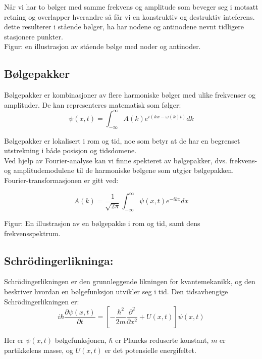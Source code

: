 Når vi har to bølger med samme frekvens og amplitude som beveger seg i motsatt retning og overlapper hverandre så får vi en konstruktiv og destruktiv inteferens. dette resulterer i stående bølger, ha har nodene og antinodene nevnt tidligere stasjonere punkter.\\
Figur: en illustrasjon av stående bølge med noder og antinoder.

\subsection*{Bølgepakker}

Bølgepakker er kombinasjoner av flere harmoniske bølger med ulike frekvenser og amplituder. De kan representeres matematisk som følger:
\begin{equation*}
\psi(x,t) = \int_{-\infty}^{\infty} A(k) e^{i(kx - \omega(k)t)} dk
\end{equation*}

Bølgepakker er lokalisert i rom og tid, noe som betyr at de har en begrenset utstrekning i både posisjon og tidsdomene.\\
Ved hjelp av Fourier-analyse kan vi finne spekteret av bølgepakker, dvs. frekvens- og amplitudemodulene til de harmoniske bølgene som utgjør bølgepakken. Fourier-transformasjonen er gitt ved:

\begin{equation*}
A(k) = \frac{1}{\sqrt{2\pi}} \int_{-\infty}^{\infty} \psi(x,t) e^{-ikx} dx
\end{equation*}

Figur: En illustrasjon av en bølgepakke i rom og tid, samt dens frekvensspektrum.

\subsection*{Schrödingerlikninga:}

Schrödingerlikningen er den grunnleggende likningen for kvantemekanikk, og den beskriver hvordan en bølgefunksjon utvikler seg i tid. Den tidsavhengige Schrödingerlikningen er:
\begin{equation*}
i\hbar\frac{\partial \psi(x,t)}{\partial t} = \left[-\frac{\hbar^2}{2m}\frac{\partial^2}{\partial x^2} + U(x,t)\right]\psi(x,t)
\end{equation*}

Her er $\psi(x,t)$ bølgefunksjonen, $\hbar$ er Plancks reduserte konstant, $m$ er partikkelens masse, og $U(x,t)$ er det potensielle energifeltet.

